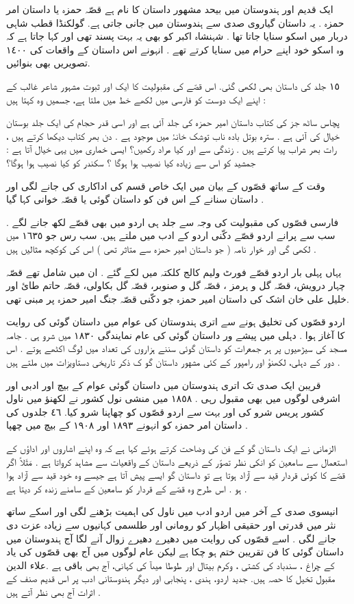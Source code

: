 \documentclass[a4paper]{article}
\begin{document}
ایک قدیم اور ہندوستان میں بیحد مشهور داستان کا نام ہے قصّہ حمزہ یا داستان امر حمزہ . یہ داستان گیاروی صدی سے ہندوستان میں جانی جاتی ہے. گولکنڈا قطب شاہی دربار میں اسکو سنایا جاتا تھا . شہنشاہ اکبر کو بھی یہ بہت پسند تھی اور کہا جاتا ہے کہ وہ اسکو خود اپنے حرام میں سنایا کرتے تھے . انہونے اس داستان کے واقعات کی ١٤٠٠ تصویریں بھی بنوائیں.

 ١٥ جلد کی داستان بھی لکھی گئی. اس قصّے کی مقبولیت کا ایک اور ثبوت مشہور شاعر غالب کے اپنے ایک دوست کو فارسی میں لکھے خط میں ملتا ہے، جسمیں وہ کہتا ہیں :

پچاس ساٹھ جز کی کتاب داستان امیر حمزہ کی جلد آئی ہے اور اسی قدر حجام کی ایک جلد بوستان خیال کی آئی ہے . سترہ بوتل بادہ ناب توشک خانۂ میں موجود ہے . دن بھر کتاب دیکھا کرتے ہیں ، رات بھر شراب پیا کرتے ہیں . زندگی سے اور کیا مراد رکھیں؟ ایسی خماری میں یہی خیال آتا ہے : جمشید کو اس سے زیادہ کیا نصیب ہوا ہوگا ؟ سکندر کو کیا نصیب ہوا ہوگا؟

وقت کے ساتھ قصّوں کے بیان  میں ایک خاص قسم کی اداکاری کی جانے لگی اور داستان سنانے کے اس فن کو داستان گوئی یا قصّہ خوانی  کہا  گیا .

فارسی قصّوں کی مقبولیت کی وجہ سے جلد ہی اردو میں بھی قصّے لکھ جانے لگے . سب سے پرانے اردو قصّے دکّنی اردو کے  ادب میں ملتے ہیں. سب رس جو ١٦٣٥ میں لکھی گی اور خوار نامہ ( جو داستان  امیر حمزہ سے متاثر تھی ) اس کی کوکچھ مثالیں ہیں .

 یہاں پہلی بار اردو قصّے فورٹ ولیم کالج کلکتہ میں لکے گئے . ان میں شامل تھے قصّہ چہار درویش، قصّہ گل و ہرمز ، قصّہ گل و صنوبر، قصّہ گل بکاولی، قصّہ حاتم طائ اور خلیل علی خان اشک کی داستان امیر حمزہ جو دکّنی قصّہ جنگ امیر حمزہ پر مبنی تھی. 

اردو قصّوں کی تخلیق ہونے سے اتری ہندوستان کی عوام میں داستان گوئی کی روایت کا آغاز ہوا . دہلی  میں  پیشے ور داستان گوئی کی عام نمایندگی ١٨٣٠ میں شرو ہی . جامہ مسجد کی سیڑھیوں پر ہر  جمعرات کو داستان گوئی سننے ہزاروں کی تعداد میں لوگ اکٹھے ہوتے . اس دور کے  دہلی، لکھنؤ اور رامپور کے کئی  مشهور داستان گو ک ذکر تاریخی دستاویزات میں  ملتے ہیں .

قریبن ایک صدی تک اتری ہندوستان میں داستان گوئی عوام کے بیچ اور ادبی اور اشرفی لوگوں میں بھی مقبول رہی . ١٨٥٨ میں منشی نول کشور نے لکھنؤ میں ناول کشور پریس شرو کی اور بہت سے اردو قصّوں کو چھاپنا شرو کیا. ٤٦ جلدوں کی داستان امر حمزہ کو انہونے ١٨٩٣ اور ١٩٠٨ کے بیچ میں چھپا .

الزمانی نے ایک داستان گو کے فن کی  وضاحت  کرتے ہوئے کہا ہے کہ وہ اپنے اشاروں اور اداؤں کے استعمال سے سامعین کو انکی نظر تصوّر کے ذریعے داستان کے واقعیات سے مشاہد کرواتا ہے . مَثَلاً اگر قصّے کا کوئی قردار قید سے آزاد ہوتا ہے تو داستان گو ایسے پیش آتا ہے  جیسے وہ خود قید سے آزاد ہوا ہو . اس طرح وہ قصّے کے قردار  کو سامعین کے سامنے زندہ کر دیتا ہے . 

انیسوی صدی کے آخر میں اردو ادب میں ناول کی اہمیت بڑھنے لگی اور اسکے ساتھ نثر میں قدرتی اور حقیقی اظہار کو رومانی اور طلسمی کہانیوں سے زیادہ عزت دی جانے لگی . اسے قصّوں کی روایت میں دھیرے دھیرے زوال آنے لگا  آج ہندوستان میں داستان گوئی کا فن تقریبن ختم ہو چکا ہے لیکن عام لوگوں میں آج بھی قصّوں کی یاد باقی ہے .علاء الدين‎ کے چراغ ، سندباد کی کشتی ، وکرم بیتال اور طوطا میںآ کی کہانی، آج بھی مقبول تخیل کا حصہ  ہیں. جدید اردو، ہندی ، پنجابی اور دیگر ہندوستانی ادب پر اس قدیم صنف کے اثرات آج بھی نظر آتے ہیں .
\end{document}
